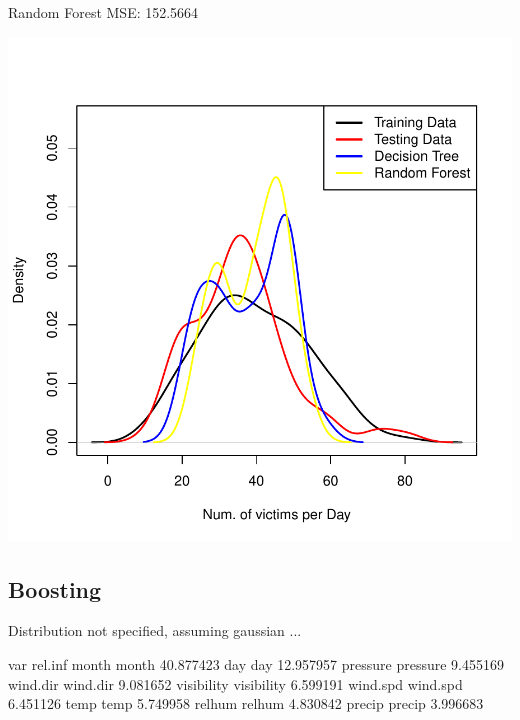 \documentclass[11pt, a4paper]{article}
\begin{document}
\begin{Schunk}
\begin{Soutput}
Random Forest MSE: 152.5664
\end{Soutput}
\end{Schunk}
\includegraphics{regression-040}





\pagebreak
\subsection{Boosting}

\begin{Schunk}
\begin{Soutput}
Distribution not specified, assuming gaussian ...
\end{Soutput}
\begin{Soutput}
                  var   rel.inf
month           month 40.877423
day               day 12.957957
pressure     pressure  9.455169
wind.dir     wind.dir  9.081652
visibility visibility  6.599191
wind.spd     wind.spd  6.451126
temp             temp  5.749958
relhum         relhum  4.830842
precip         precip  3.996683
\end{Soutput}
\end{Schunk}
\end{document}
